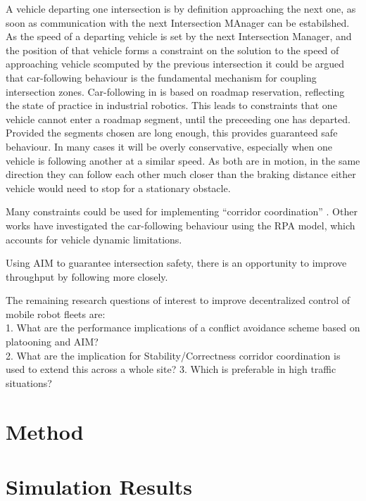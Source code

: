 \documentclass[runningheads]{llncs}
\begin{document}
A vehicle departing one intersection is by definition approaching the next one, as soon as communication with the next Intersection MAnager can be estabilshed. As the speed of a departing vehicle is set by the next Intersection Manager, and the position of that vehicle forms a constraint on the solution to the speed of approaching vehicle scomputed by the previous intersection it could be argued that car-following behaviour is the fundamental mechanism for coupling intersection zones. Car-following in \cite{Digani2019} is based on roadmap reservation, reflecting the state of practice in industrial robotics. This leads to constraints that one vehicle cannot enter a roadmap segment, until the preceeding one has departed. Provided the segments chosen are long enough, this provides guaranteed safe behaviour. In many cases it will be overly conservative, especially when one vehicle is following another at a similar speed. As both are in motion, in the same direction they can follow each other much closer than the braking distance either vehicle would need to stop for a stationary obstacle.

   Many constraints could be used for implementing ``corridor coordination'' . Other works have investigated the car-following behaviour \cite{Bichiou2019} using the RPA model, which accounts for vehicle dynamic limitations. 


Using AIM to guarantee intersection safety, there is an opportunity to improve throughput by following more closely. 
 
The remaining research questions of interest to improve decentralized control of mobile robot fleets are:\\
1.  What are the performance implications of a conflict avoidance scheme based on platooning and AIM? \\
2. What are the implication for Stability/Correctness corridor coordination is used to extend this across a whole site?
3.  Which is preferable in high traffic situations?\\










\section{Method}
\section{Simulation Results}
\end{document}
